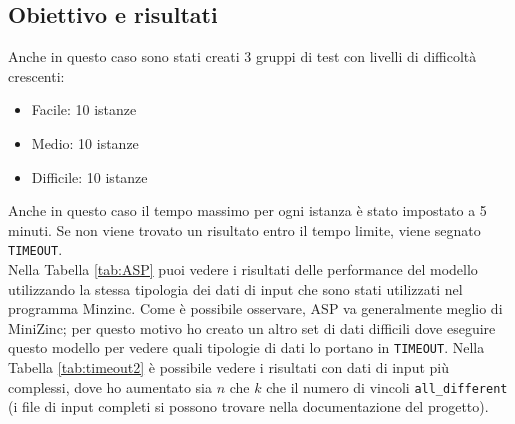 \documentclass{article}
\begin{document}
\begin{multicols*}{2}
\subsection{Obiettivo e risultati}
Anche in questo caso sono stati creati 3 gruppi di test con livelli di difficoltà crescenti:
\begin{itemize}
    \item Facile: 10 istanze
    \item Medio: 10 istanze
    \item Difficile: 10 istanze
\end{itemize}
Anche in questo caso il tempo massimo per ogni istanza è stato impostato a 5 minuti. 
Se non viene trovato un risultato entro il tempo limite, viene segnato \texttt{TIMEOUT}.
\\
Nella Tabella \ref{tab:ASP} puoi vedere i risultati delle performance del modello utilizzando la stessa tipologia dei dati di 
input che sono stati utilizzati nel programma Minzinc. 
Come è possibile osservare, ASP va generalmente meglio di MiniZinc; 
per questo motivo ho creato un altro set di dati difficili dove eseguire questo modello per vedere quali tipologie di dati 
lo portano in \texttt{TIMEOUT}. Nella Tabella \ref{tab:timeout2} è possibile vedere i risultati con dati di input più complessi,
dove ho aumentato sia $n$ che $k$ che il numero di vincoli \texttt{all\_different} 
(i file di input completi si possono trovare nella documentazione del progetto).


\end{multicols*}
\end{document}
